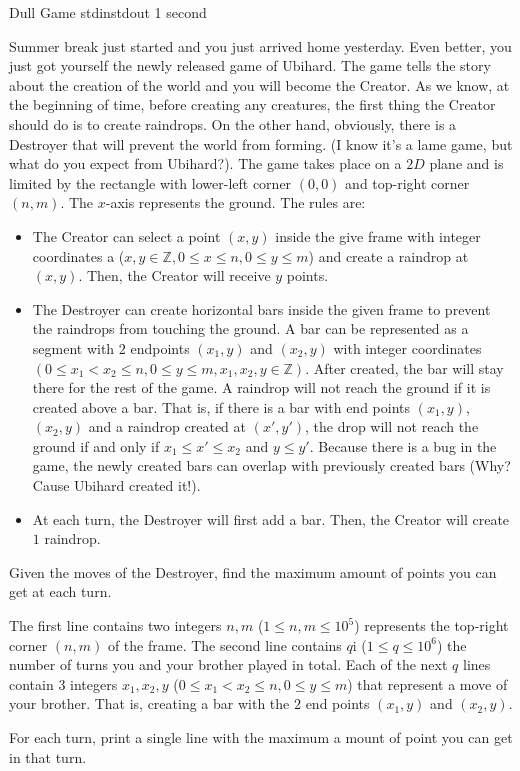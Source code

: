 \begin{problem}{Dull Game}
{stdin}{stdout}
{1 second}{}{}

Summer break just started and you just arrived home yesterday. Even better, you just got yourself the newly released game of Ubihard. The game tells the story about the creation of the world and you will become the Creator. As we know, at the beginning of time, before creating any creatures, the first thing the Creator should do is to create raindrops. On the other hand, obviously, there is a Destroyer that will prevent the world from forming. (I know it's a lame game, but what do you expect from Ubihard?). The game takes place on a $2D$ plane and is limited by the rectangle with lower-left corner $(0, 0)$ and top-right corner $(n, m)$. The $x$-axis represents the ground. The rules are:
	\begin{itemize}
		\item
		The Creator can select a point $(x, y)$ inside the give frame with integer coordinates a ($x, y \in \mathbb{Z}, 0 \leq x \leq n, 0 \leq y \leq m$) and create a raindrop at $(x, y)$. Then, the Creator will receive $y$ points.
		\item
		The Destroyer can create horizontal bars inside the given frame to prevent the raindrops from touching the ground. A bar can be represented as a segment with $2$ endpoints $(x_1, y)$ and $(x_2, y)$ with integer coordinates $(0 \leq x_1 < x_2 \leq n, 0 \leq y \leq m, x_1, x_2, y \in \mathbb{Z})$. After created, the bar will stay there for the rest of the game. A raindrop will not reach the ground if it is created above a bar. That is, if there is a bar with end points $(x_1, y)$, $(x_2, y)$ and a raindrop created at $(x', y')$, the drop will not reach the ground if and only if $x_1 \leq x' \leq x_2$ and $y \leq y'$. Because there is a bug in the game, the newly created bars can overlap with previously created bars (Why? Cause Ubihard created it!).
		\item
		At each turn, the Destroyer will first add a bar. Then, the Creator will create $1$ raindrop.
	\end{itemize}

\noindent Given the moves of the Destroyer, find the maximum amount of points you can get at each turn.

\InputFile

The first line contains two integers $n, m$ ($1 \leq n, m \leq 10^5$) represents the top-right corner $(n, m)$ of the frame. The second line contains $q$i ($1 \leq q \leq 10^6$) the number of turns you and your brother played in total. Each of the next $q$ lines contain $3$ integers $x_1, x_2, y$ ($0 \leq x_1 < x_2 \leq n, 0 \leq y \leq m$) that represent a move of your brother. That is, creating a bar with the $2$ end points $(x_1, y)$ and $(x_2, y)$.

\OutputFile

For each turn, print a single line with the maximum a mount of point you can get in that turn.

\Examples

\begin{example}
%
\end{example}

\end{problem}
